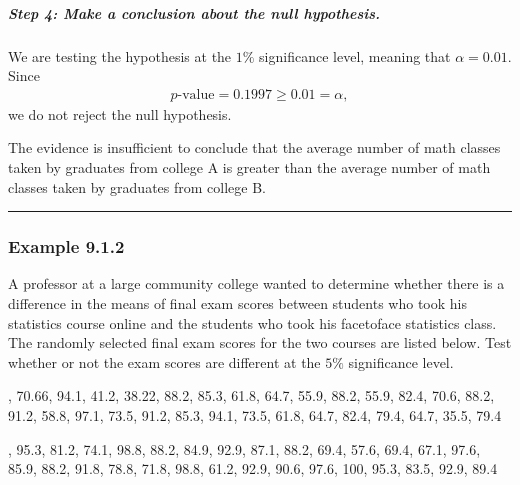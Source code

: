 \documentclass[letterpaper,10pt,english]{jupyterBook}
\begin{document}
\subparagraph{Step 4: Make a conclusion about the null hypothesis.}
\label{\detokenize{Ch9 Hypothesis Tests of Two or More Populations/9.1 Hypothesis Testing Two Population Means:step-4-make-a-conclusion-about-the-null-hypothesis}}
\sphinxAtStartPar
We are testing the hypothesis at the \(1\%\) significance level, meaning that \(\alpha = 0.01\). Since
\begin{equation*}
\begin{split}p\text{-value} = 0.1997 \geq 0.01 = \alpha,\end{split}
\end{equation*}
\sphinxAtStartPar
we do not reject the null hypothesis.

\sphinxAtStartPar
The evidence is insufficient to conclude that the average number of math classes taken by graduates from college A is greater than the average number of math classes taken by graduates from college B.


\bigskip\hrule\bigskip



\subsubsection{Example 9.1.2}
\label{\detokenize{Ch9 Hypothesis Tests of Two or More Populations/9.1 Hypothesis Testing Two Population Means:example-9-1-2}}
\sphinxAtStartPar
A professor at a large community college wanted to determine whether there is a difference in the means of final exam scores between students who took his statistics course online and the students who took his face\sphinxhyphen{}to\sphinxhyphen{}face statistics class. The randomly selected final exam scores for the two courses are listed below. Test whether or not the exam scores are different at the \(5\%\) significance level.

\sphinxAtStartPar
{}

, 70.66, 94.1, 41.2, 38.22, 88.2, 85.3, 61.8, 64.7, 55.9, 88.2, 55.9, 82.4, 70.6, 88.2, 91.2, 58.8, 97.1, 73.5, 91.2, 85.3, 94.1, 73.5, 61.8, 64.7, 82.4, 79.4, 64.7, 35.5, 79.4

\sphinxAtStartPar
{}

, 95.3, 81.2, 74.1, 98.8, 88.2, 84.9, 92.9, 87.1, 88.2, 69.4, 57.6, 69.4, 67.1, 97.6, 85.9, 88.2, 91.8, 78.8, 71.8, 98.8, 61.2, 92.9, 90.6, 97.6, 100, 95.3, 83.5, 92.9, 89.4
\end{document}
